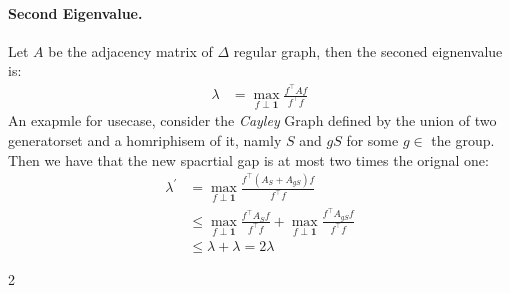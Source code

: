 \documentclass{article}
\begin{document}
\begin{multicols*}{2}
  \paragraph{Second Eigenvalue.} Let $A$ be the adjacency matrix of $\Delta$ regular graph, then the seconed eignenvalue is:
  \begin{equation*}
    \begin{split}
      \lambda &= \max_{f \perp \mathbf{1}} { \frac{f^{\top}A f  }{ f^{\top}f}}
    \end{split}
  \end{equation*}
  An exapmle for usecase, consider the \emph{Cayley} Graph defined by the union of two generatorset and a homriphisem of it, namly $S$ and $gS$ for some $g \in $ the group. Then we have that the new spacrtial gap is at most two times the orignal one:    
  \begin{equation*}
    \begin{split}	
      \lambda^{\prime} &= \max_{f \perp \mathbf{1}} { \frac{f^{\top} \left( A_{S} + A_{gS} \right) f  }{ f^{\top}f}} \\
      & \le  \max_{f \perp \mathbf{1}} { \frac{f^{\top}A_{S} f  }{ f^{\top}f}} +  \max_{f \perp \mathbf{1}} { \frac{f^{\top}A_{gS} f  }{ f^{\top}f}} \\
      & \le \lambda + \lambda = 2\lambda
    \end{split}
  \end{equation*}
\end{multicols*}{2}
\end{document}
